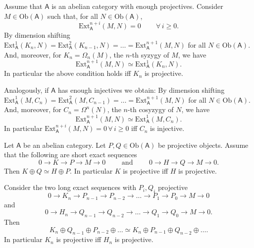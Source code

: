 \begin{rem}[]
	Assume that $\mathsf{A}$ is an abelian category with enough projectives.
	Consider $M \in \mathrm{Ob} \left(\mathsf{A}\right)$ such that,
	for all $N \in \mathrm{Ob} \left(\mathsf{A}\right)$,
	\begin{equation}
		\mathrm{Ext}^{n+i}_{\mathsf{A}}(M,N) = 0 \qquad \,\forall\, i \geq 0
	.\end{equation} 
	By dimension shifting $\mathrm{Ext}^1_{\mathsf{A}}(K_n,N) = \mathrm{Ext}^2_{\mathsf{A}}(K_{n-1},N) =
	\ldots = \mathrm{Ext}^{n+1}_{\mathsf{A}}(M,N)$ for all $N \in \mathrm{Ob} \left(\mathsf{A}\right)$.
	And, moreover, for $K_n = \Omega_n(M)$, the $n$-th syzygy of $M$, we have
	\begin{equation}
		\mathrm{Ext}^{n+1}_{\mathsf{A}}(M,N) \simeq
		\mathrm{Ext}^1_{\mathsf{A}}(K_n,N)
	.\end{equation} 
	In particular the above condition holds iff $K_n$ is projective.

	Analogously, if $\mathsf{A}$ has enough injectives we obtain:
	By dimension shifting $\mathrm{Ext}^1_{\mathsf{A}}(M,C_n) = \mathrm{Ext}^2_{\mathsf{A}}(M,C_{n-1}) =
	\ldots = \mathrm{Ext}^{n+1}_{\mathsf{A}}(M,N)$ for all $N \in \mathrm{Ob} \left(\mathsf{A}\right)$.
	And, moreover, for $C_n = \Omega^n(N)$, the $n$-th cosyzygy of $N$, we have
	\begin{equation}
		\mathrm{Ext}^{n+1}_{\mathsf{A}}(M,N) \simeq
		\mathrm{Ext}^1_{\mathsf{A}}(M,C_n)
	.\end{equation} 
	In particular $\mathrm{Ext}^{n+i}_{\mathsf{A}}(M,N) = 0 \,\forall\, i \geq 0$
	iff $C_n$ is injective.
\end{rem}

\begin{lem}[Schanuel]
	Let $\mathsf{A}$ be an abelian category. Let $P,Q \in \mathrm{Ob} \left(\mathsf{A}\right)$
	be projective objects.
	Assume that the following are short exact sequences
	\begin{equation}
	0\to K\to P \to M \to 0
	\qquad \text{ and } \qquad
	0 \to H \to Q \to M \to 0
	.\end{equation} 
	Then $K \oplus Q \simeq H \oplus P$.
	In particular $K$ is projective iff $H$ is projective.
\end{lem} 
\begin{cor}
	Consider the two long exact sequences with $P_{i}, Q_{i}$ projective
	\begin{equation}
	0 \to K_n \to P_{n-1} \to P_{n-2} \to \ldots \to P_1 \to P_0 \to M \to 0
	\end{equation} 
	and
	\begin{equation}
	0 \to H_n \to Q_{n-1} \to Q_{n-2} \to \ldots \to Q_1 \to Q_0 \to M \to 0
	.\end{equation} 
	Then
	\begin{equation}
	K_n \oplus Q_{n-1} \oplus P_{n-2} \oplus \ldots \simeq
	K_n \oplus P_{n-1} \oplus Q_{n-2} \oplus \ldots
	.\end{equation} 
	In particular $K_n$ is projective iff $H_n$ is projective.
\end{cor} 


